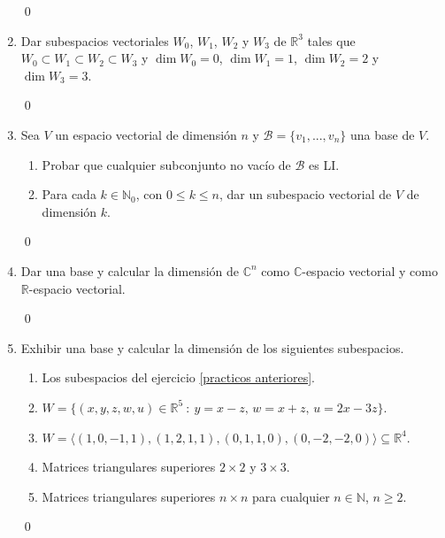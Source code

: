 \begin{enumerate}[resume, topsep=6pt, itemsep=.4cm]
    
    \rta 

    \qed     
    
    \item Dar subespacios vectoriales $W_0$, $W_1$, $W_2$ y $W_3$ de $\mathbb{R}^3$ tales que $W_0\subset W_1\subset W_2\subset W_3$ y $\dim W_0=0$, $\dim W_1=1$, $\dim W_2=2$ y $\dim W_3=3$.
    
    
    \rta 

    \qed     
    
    \item Sea $V$ un espacio vectorial de dimensión $n$ y $\mathcal{B}=\{v_1, ..., v_n\}$ una base de $V$.
    \begin{enumerate}
    \item Probar que cualquier subconjunto no vacío de $\mathcal{B}$ es LI.
    \item Para cada $k\in\mathbb{N}_0$,  con $0\leq k\leq n$, dar un subespacio vectorial de $V$ de dimensión $k$.
    \end{enumerate}
    
    
    \rta 

    \qed     
    
    \item Dar una base y calcular la dimensión de $\mathbb{C}^n$ como $\mathbb{C}$-espacio vectorial y como $\mathbb{R}$-espacio vectorial.
    
    
    \rta 

    \qed     
    
    \item  Exhibir una base y calcular la dimensión de los siguientes subespacios.
    \begin{enumerate}
        \item Los subespacios del ejercicio \ref{practicos anteriores}.
        \item $W = \{(x,y,z,w,u) \in \mathbb{R}^5 \ : \ y = x - z,\, w = x + z,\,  u = 2x - 3z \}$.
        \item $W = \langle (1, 0, -1, 1),  (1, 2, 1, 1), (0, 1, 1, 0), (0, -2, -2, 0) \rangle \subseteq \mathbb R^4$.
        \item Matrices triangulares superiores $2\times 2$ y $3\times 3$.
        \item Matrices triangulares superiores $n\times n$ para cualquier $n\in\mathbb{N}$, $n\geq 2$.
    \end{enumerate}
    
    \rta 

    \qed     
    

\end{enumerate}
